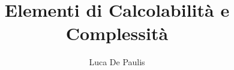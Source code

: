 \documentclass[
    oneside,
    10pt,
    language=italian,
    pagestyle=notes,
    fontstyle=palaeuler,
    thmstyle=boxed,
    colors
]{modernth}
\begin{document}
\author{Luca De Paulis}
\title{Elementi di Calcolabilità e Complessità}
\maketitle

\frontmatter{}
\tableofcontents

\mainmatter{}


\end{document}

